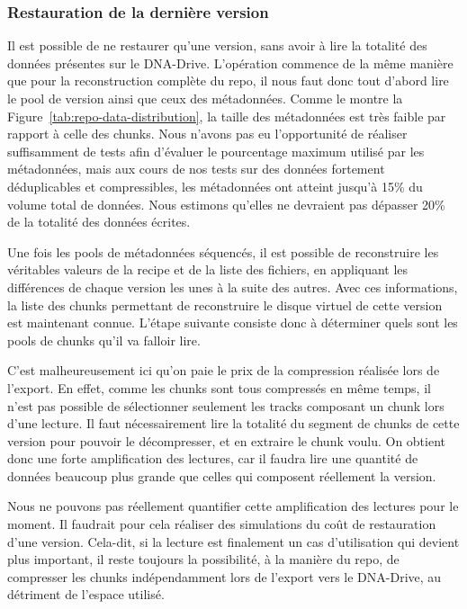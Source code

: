 \documentclass[a4paper]{report}
\begin{document}
\subsubsection{Restauration de la dernière version}

Il est possible de ne restaurer qu'une version,
sans avoir à lire la totalité des données présentes sur le DNA-Drive.
L'opération commence de la même manière que pour la reconstruction complète du repo,
il nous faut donc tout d'abord lire le pool de version ainsi que ceux des métadonnées.
Comme le montre la Figure~\ref{tab:repo-data-distribution},
la taille des métadonnées est très faible par rapport à celle des chunks.
Nous n'avons pas eu l'opportunité de réaliser suffisamment de tests
afin d'évaluer le pourcentage maximum utilisé par les métadonnées,
mais aux cours de nos tests sur des données fortement déduplicables et compressibles,
les métadonnées ont atteint jusqu'à 15\% du volume total de données.
Nous estimons qu'elles ne devraient pas dépasser 20\% de la totalité des données écrites.

Une fois les pools de métadonnées séquencés,
il est possible de reconstruire les véritables valeurs
de la recipe et de la liste des fichiers,
en appliquant les différences de chaque version les unes à la suite des autres.
Avec ces informations, la liste des chunks permettant
de reconstruire le disque virtuel de cette version est maintenant connue.
L'étape suivante consiste donc à déterminer quels sont les pools de chunks qu'il va falloir lire.

C'est malheureusement ici qu'on paie le prix de la compression réalisée lors de l'export.
En effet, comme les chunks sont tous compressés en même temps,
il n'est pas possible de sélectionner seulement les tracks composant un chunk lors d'une lecture.
Il faut nécessairement lire la totalité du segment de chunks de cette version
pour pouvoir le décompresser, et en extraire le chunk voulu.
On obtient donc une forte amplification des lectures,
car il faudra lire une quantité de données beaucoup plus grande que celles qui composent réellement la version.

Nous ne pouvons pas réellement quantifier cette amplification des lectures pour le moment.
Il faudrait pour cela réaliser des simulations du coût de restauration d'une version.
Cela-dit, si la lecture est finalement un cas d'utilisation qui devient plus important,
il reste toujours la possibilité, à la manière du repo,
de compresser les chunks indépendamment lors de l'export vers le DNA-Drive,
au détriment de l'espace utilisé.
\end{document}
